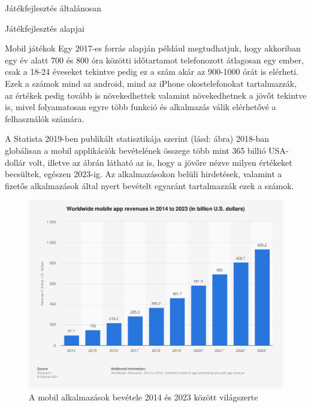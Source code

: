 \begin{MyChapter}{Játékfejlesztés általánosan}
\begin{MySection}{Játékfejlesztés alapjai}
\begin{MySubSection}{Mobil játékok}
		Egy 2017-es forrás alapján \cite{smartphone_statistics} például megtudhatjuk, hogy akkoriban egy év alatt 700 és 800 óra közötti időtartamot telefonozott átlagosan egy ember, csak a 18-24 éveseket tekintve pedig ez a szám akár az 900-1000 órát is elérheti. Ezek a számok mind az android, mind az iPhone okostelefonokat tartalmazzák, az értékek pedig tovább is növekedhettek valamint növekedhetnek a jövőt tekintve is, mivel folyamatosan egyre több funkció és alkalmazás válik elérhetővé a felhasználók számára.
		\cite{mobile_evolution}
		
		A Statista 2019-ben publikált statisztikája \cite{mobile_app_revenue} szerint (lásd:  ábra) 2018-ban globálisan a mobil applikációk bevételének összege több mint 365 billió USA-dollár volt, illetve az ábrán látható az is, hogy a jövőre nézve milyen értékeket becsültek, egészen 2023-ig. Az alkalmazásokon belüli hirdetések, valamint a fizetős alkalmazások által nyert bevételt egyaránt tartalmazzák ezek a számok.
		\begin{figure}[h!]
			\centering
			\includegraphics[scale=0.38]{kepek/mobil/total_global_mobile_app_revenues_2014-2023.png}
			\caption{A mobil alkalmazások bevétele 2014 és 2023 között világszerte}
			\label{fig:mobil:total_global_mobile_app_revenues_2014-2023}
		\end{figure}
		

\end{MySubSection}
\end{MySection}
\end{MyChapter}
